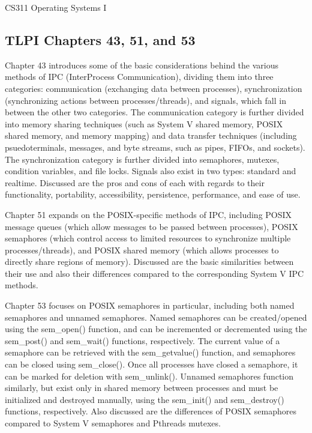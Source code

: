 \documentclass[letterpaper,10pt,fleqn]{article}
\numberwithin{equation}{section}
\begin{document}



{\Large CS311 Operating Systems I}

\subsection*{TLPI Chapters 43, 51, and 53}

Chapter 43 introduces some of the basic considerations behind the various methods of IPC (InterProcess Communication), dividing them into three categories: communication (exchanging data between processes), synchronization (synchronizing actions between processes/threads), and signals, which fall in between the other two categories.  The communication category is further divided into memory sharing techniques (such as System V shared memory, POSIX shared memory, and memory mapping) and data transfer techniques (including psuedoterminals, messages, and byte streams, such as pipes, FIFOs, and sockets).  The synchronization category is further divided into semaphores, mutexes, condition variables, and file locks.  Signals also exist in two types: standard and realtime.  Discussed are the pros and cons of each with regards to their functionality, portability, accessibility, persistence, performance, and ease of use.

Chapter 51 expands on the POSIX-specific methods of IPC, including POSIX message queues (which allow messages to be passed between processes), POSIX semaphores (which control access to limited resources to synchronize multiple processes/threads), and POSIX shared memory (which allows processes to directly share regions of memory).  Discussed are the basic similarities between their use and also their differences compared to the corresponding System V IPC methods.

Chapter 53 focuses on POSIX semaphores in particular, including both named semaphores and unnamed semaphores.  Named semaphores can be created/opened using the sem\_open() function, and can be incremented or decremented using the sem\_post() and sem\_wait() functions, respectively.  The current value of a semaphore can be retrieved with the sem\_getvalue() function, and semaphores can be closed using sem\_close().  Once all processes have closed a semaphore, it can be marked for deletion with sem\_unlink().  Unnamed semaphores function similarly, but exist only in shared memory between processes and must be initialized and destroyed manually, using the sem\_init() and sem\_destroy() functions, respectively.  Also discussed are the differences of POSIX semaphores compared to System V semaphores and Pthreads mutexes.
\end{document}
